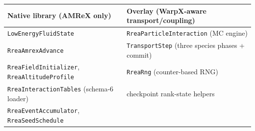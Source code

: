 \documentclass[11pt]{article}
\DeclareRobustCommand{\code}[1]{\ifmmode\text{\ttfamily#1}\else\nolinkurl{#1}\fi}
\begin{document}
\begin{center}
\begin{tabular}{@{}>{\raggedright\arraybackslash}p{}>{\raggedright\arraybackslash}p{}@{}}
\toprule
\textbf{Native library (AMReX only)} & \textbf{Overlay (WarpX-aware transport/coupling)} \\
\midrule
\code{LowEnergyFluidState} & \code{RreaParticleInteraction} (MC engine) \\
\code{RreaAmrexAdvance} & \code{TransportStep} (three species phases + commit) \\
\code{RreaFieldInitializer}, \code{RreaAltitudeProfile} & \code{RreaRng}
(counter-based RNG) \\
\code{RreaInteractionTables} (schema-6 loader) & checkpoint rank-state
helpers \\
\code{RreaEventAccumulator}, \code{RreaSeedSchedule} & \\
\bottomrule
\end{tabular}
\end{center}
\end{document}
